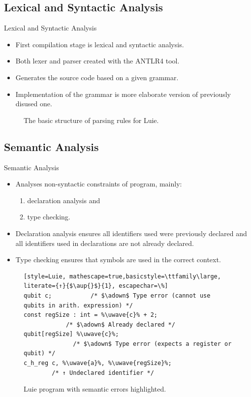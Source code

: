 \subsection{Lexical and Syntactic Analysis}
\begin{frame}{Lexical and Syntactic Analysis}
    \begin{itemize}
        \item First compilation stage is lexical and syntactic analysis.
        \item Both lexer and parser created with the ANTLR4 tool.
        \item Generates the source code based on a given grammar. 
        \item Implementation of the grammar is more elaborate version of previously disused one.
    \end{itemize}
    \begin{figure}[h]
        \centering
        
        \caption{The basic structure of parsing rules for Luie.}
    \end{figure}
\end{frame}

\subsection{Semantic Analysis}
\begin{frame}[fragile]{Semantic Analysis}
    \begin{itemize}
        \item Analyses non-syntactic constraints of program, mainly:
        \begin{enumerate}
            \item declaration analysis and
            \item type checking.
        \end{enumerate}
        \item Declaration analysis ensures all identifiers used were previously declared and all identifiers used in declarations are not already declared.
        \item Type checking ensures that symbols are used in the correct context.
    \end{itemize}
    \vfill
    \begin{figure}[htp]
        \centering     
        \begin{lstlisting}[style=Luie, mathescape=true,basicstyle=\ttfamily\large, literate={↑}{$\aup{}$}{1}, escapechar=\%] 
qubit c;           /* $\adown$ Type error (cannot use qubits in arith. expression) */       
const regSize : int = %\uwave{c}% + 2; 
            /* $\adown$ Already declared */      
qubit[regSize] %\uwave{c}%;
              /* $\adown$ Type error (expects a register or qubit) */                      
c_h_reg c, %\uwave{a}%, %\uwave{regSize}%;
        /* ↑ Undeclared identifier */                 
        \end{lstlisting}
        \caption{Luie program with semantic errors highlighted.}
    \end{figure}
\end{frame}

